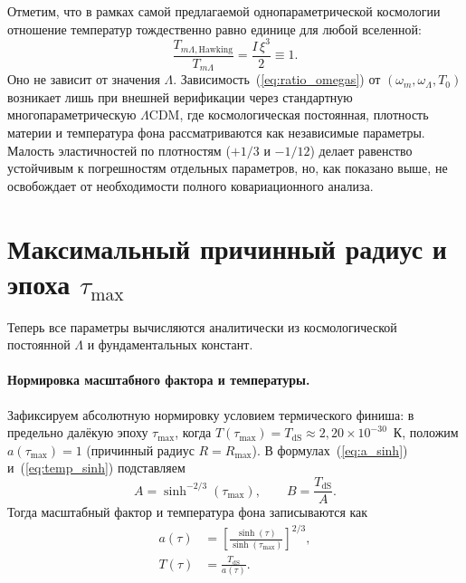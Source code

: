 \documentclass[12pt,a4paper]{article}
\begin{document}
Отметим, что в рамках самой предлагаемой однопараметрической космологии отношение температур тождественно равно единице для любой вселенной:
\begin{equation}
\frac{T_{m\Lambda\mathrm{, Hawking}}}{T_{m\Lambda}} = \frac{I\,\xi^3}{2} \equiv 1.
\end{equation}
Оно не зависит от значения $\Lambda$. Зависимость~(\ref{eq:ratio_omegas}) от $(\omega_m, \omega_\Lambda, T_0)$ возникает лишь при внешней верификации через стандартную многопараметрическую $\Lambda$CDM, где космологическая постоянная, плотность материи и температура фона рассматриваются как независимые параметры. Малость эластичностей по плотностям ($+1/3$ и $-1/12$) делает равенство устойчивым к погрешностям отдельных параметров, но, как показано выше, не освобождает от необходимости полного ковариационного анализа.

\section{Максимальный причинный радиус и эпоха \texorpdfstring{$\tau_{\max}$}{τ\_max}}
\label{sec:taumax}

Теперь все параметры вычисляются аналитически из космологической постоянной $\Lambda$ и фундаментальных констант.

\paragraph{Нормировка масштабного фактора и температуры.}
Зафиксируем абсолютную нормировку условием термического финиша: в предельно далёкую эпоху $\tau_{\max}$, когда $T(\tau_{\max}) = T_{\mathrm{dS}} \approx 2{,}20 \times 10^{-30}$~К, положим $a(\tau_{\max}) = 1$ (причинный радиус $R = R_{\max}$). В формулах~(\ref{eq:a_sinh}) и~(\ref{eq:temp_sinh}) подставляем
\begin{equation}
A = \sinh^{-2/3}(\tau_{\max}), \qquad B = \frac{T_{\mathrm{dS}}}{A}.
\end{equation}
Тогда масштабный фактор и температура фона записываются как
\begin{align}
a(\tau) &= \left[\frac{\sinh(\tau)}{\sinh(\tau_{\max})}\right]^{2/3}, \label{eq:scale} \\[6pt]
T(\tau) &= \frac{T_{\mathrm{dS}}}{a(\tau)}. \label{eq:temp}
\end{align}
\end{document}
